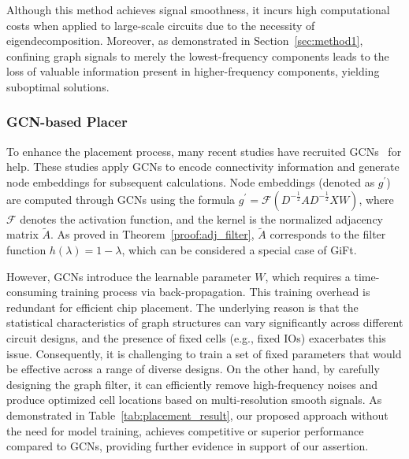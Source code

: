 Although this method achieves signal smoothness, it incurs high computational costs when applied to large-scale circuits due to the necessity of eigendecomposition. Moreover, as demonstrated in Section~\ref{sec:method1}, confining graph signals to merely the lowest-frequency components leads to the loss of valuable information present in higher-frequency components, yielding suboptimal solutions.


\subsubsection{GCN-based Placer}
To enhance the placement process, many recent studies have recruited GCNs~\cite{graphplanner, CY2021} for help. These studies apply GCNs to encode connectivity information and generate node embeddings for subsequent calculations.
Node embeddings (denoted as $g^{\prime}$) are computed through GCNs using the formula $g^{\prime}=\mathcal{F}(D^{-\frac{1}{2}}AD^{-\frac{1}{2}}XW)$, where $\mathcal{F}$ denotes the activation function, and the kernel is the normalized adjacency matrix $\tilde{A}$.
As proved in Theorem~\ref{proof:adj_filter}, $\tilde{A}$ corresponds to the filter function $h(\lambda)=1-\lambda$, which can be considered a special case of GiFt.

However, GCNs introduce the learnable parameter $W$, which requires a time-consuming training process via back-propagation. This training overhead is redundant for efficient chip placement. The underlying reason is that the statistical characteristics of graph structures can vary significantly across different circuit designs, and the presence of fixed cells (e.g., fixed IOs) exacerbates this issue. Consequently, it is challenging to train a set of fixed parameters that would be effective across a range of diverse designs.
On the other hand, by carefully designing the graph filter, it can efficiently remove high-frequency noises and produce optimized cell locations based on multi-resolution smooth signals. As demonstrated in Table~\ref{tab:placement_result}, our proposed approach without the need for model training, achieves competitive or superior performance compared to GCNs, providing further evidence in support of our assertion.
